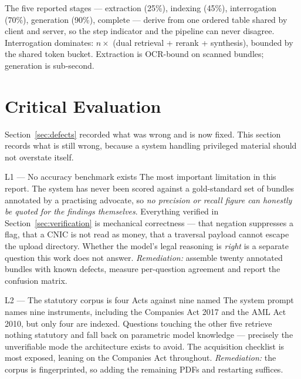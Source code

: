 \documentclass[11pt,a4paper]{article}
\begin{document}
The five reported stages --- extraction (25\%), indexing (45\%), interrogation (70\%),
generation (90\%), complete --- derive from one ordered table shared by client and server,
so the step indicator and the pipeline can never disagree. Interrogation dominates:
$n \times$ (dual retrieval + rerank + synthesis), bounded by the shared token bucket.
Extraction is OCR-bound on scanned bundles; generation is sub-second.

\section{Critical Evaluation}
\label{sec:critical}

Section~\ref{sec:defects} recorded what was wrong and is now fixed. This section records
what is still wrong, because a system handling privileged material should not overstate
itself.

\begin{riskbox}{L1 --- No accuracy benchmark exists}
\small
The most important limitation in this report. The system has never been scored against a
gold-standard set of bundles annotated by a practising advocate, so \emph{no precision or
recall figure can honestly be quoted for the findings themselves}. Everything verified in
Section~\ref{sec:verification} is mechanical correctness --- that negation suppresses a
flag, that a CNIC is not read as money, that a traversal payload cannot escape the upload
directory. Whether the model's legal reasoning is \emph{right} is a separate question this
work does not answer. \emph{Remediation:} assemble twenty annotated bundles with known
defects, measure per-question agreement and report the confusion matrix.
\end{riskbox}

\begin{riskbox}{L2 --- The statutory corpus is four Acts against nine named}
\small
The system prompt names nine instruments, including the Companies Act 2017 and the AML Act
2010, but only four are indexed. Questions touching the other five retrieve nothing
statutory and fall back on parametric model knowledge --- precisely the unverifiable mode
the architecture exists to avoid. The acquisition checklist is most exposed, leaning on the
Companies Act throughout. \emph{Remediation:} the corpus is fingerprinted, so adding the
remaining PDFs and restarting suffices.
\end{riskbox}
\end{document}

